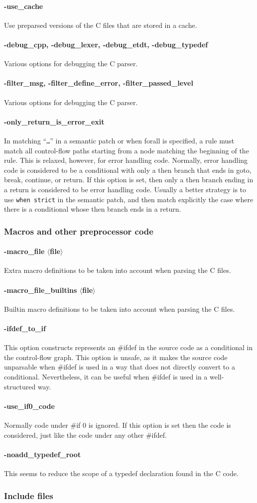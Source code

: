 \documentclass{article}
\newcommand{\normal}[2]{\paragraph*{\makebox[0in][r]{\BigLowerDiamond\,\,} {{#1}}} {#2}}
\newcommand{\rare}[2]{\paragraph*{\makebox[0in][r]{\BigDiamondshape\,\,} {{#1}}} {#2}}
\newcommand{\developer}[2]{\paragraph*{{#1}} {#2}}
\begin{document}
\developer{-use\_cache} Use preparsed versions of the C files that are
stored in a cache.

\developer{-debug\_cpp, -debug\_lexer, -debug\_etdt,
  -debug\_typedef}{Various options for debugging the C parser.}

\developer{-filter\_msg, -filter\_define\_error,
  -filter\_passed\_level}{Various options for debugging the C parser.}

\developer{-only\_return\_is\_error\_exit}{In matching ``{\tt{\ldots}}'' in
  a semantic patch or when forall is specified, a rule must match all
  control-flow paths starting from a node matching the beginning of the
  rule.  This is relaxed, however, for error handling code.  Normally, error
  handling code is considered to be a conditional with only a then branch
  that ends in goto, break, continue, or return.  If this option is set,
  then only a then branch ending in a return is considered to be error
  handling code.  Usually a better strategy is to use {\tt when strict} in
  the semantic patch, and then match explicitly the case where there is a
  conditional whose then branch ends in a return.}

\subsubsection*{Macros and other preprocessor code}

\normal{-macro\_file $\langle$file$\rangle$}{
  Extra macro definitions to be taken into account when parsing the C
  files.}

\normal{-macro\_file\_builtins $\langle$file$\rangle$}{
  Builtin macro definitions to be taken into account when parsing the C
  files.}

\rare{-ifdef\_to\_if}{ This option constructs represents an \#ifdef in
the source code as a conditional in the control-flow graph.  This option is
unsafe, as it makes the source code unparsable when \#ifdef is used in a
way that does not directly convert to a conditional.  Nevertheless, it can
be useful when \#ifdef is used in a well-structured way.}

\rare{-use\_if0\_code}{ Normally code under \#if 0 is ignored.  If this
option is set then the code is considered, just like the code under any
other \#ifdef.}

\developer{-noadd\_typedef\_root}{This seems to reduce the scope of a
  typedef declaration found in the C code.}

\subsubsection*{Include files}
\end{document}
